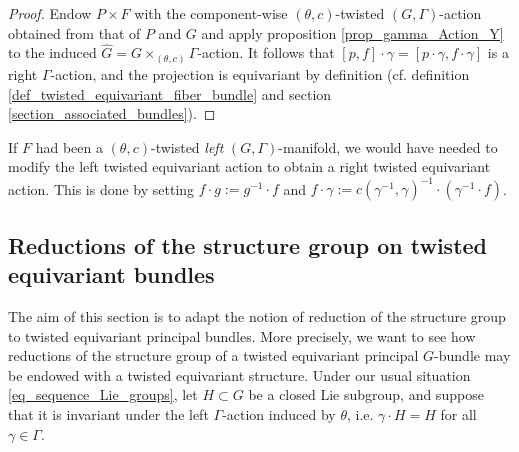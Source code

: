 \begin{proof}
    Endow \(P \times F\) with the component-wise \((\theta,c)\)-twisted \((G, \Gamma)\)-action obtained from that of \(P\) and \(G\) and apply proposition \ref{prop_gamma_Action_Y} to the induced \(\hat{G}=G\times_{(\theta,c)}\Gamma\)-action. It follows that \([p,f]\cdot \gamma=[p\cdot \gamma, f\cdot \gamma]\) is a right \(\Gamma\)-action, and the projection is equivariant by definition (cf. definition \ref{def_twisted_equivariant_fiber_bundle} and section \ref{section_associated_bundles}).
\end{proof}

\begin{obs} \label{obs_right_left_twisted_actions}
    If \(F\) had been a \((\theta,c)\)-twisted \textit{left} \((G, \Gamma)\)-manifold, we would have needed to modify the left twisted equivariant action to obtain a right twisted equivariant action. This is done by setting \(f\cdot g:=g^{-1}\cdot f\) and \(f\cdot \gamma:=c(\gamma^{-1}, \gamma)^{-1}\cdot (\gamma^{-1}\cdot f)\).
\end{obs}

\subsection{Reductions of the structure group on twisted equivariant bundles}
The aim of this section is to adapt the notion of reduction of the structure group to twisted equivariant principal bundles. More precisely, we want to see how reductions of the structure group of a twisted equivariant principal \(G\)-bundle may be endowed with a twisted equivariant structure. Under our usual situation \eqref{eq_sequence_Lie_groups}, let \(H \subset G\) be a closed Lie subgroup, and suppose that it is invariant under the  left \(\Gamma\)-action induced by \(\theta\), i.e. \(\gamma\cdot H=H\) for all \(\gamma\in \Gamma\). 

